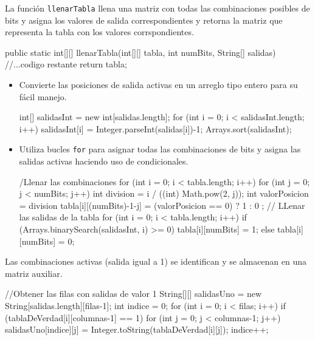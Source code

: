 La función \texttt{llenarTabla} llena una matriz con todas las combinaciones posibles de bits y asigna los valores de salida correspondientes y retorna la matriz que representa la tabla con los valores corrspondientes.
\begin{javaCode}
    public static int[][] llenarTabla(int[][] tabla, int numBits, String[] salidas) {
    //...codigo restante
    return tabla;
    }
\end{javaCode}
   \begin{itemize}
       \item[{\ieeeguilsinglright}] {\it } Convierte las posiciones de salida activas en un arreglo tipo entero para su fácil manejo.
   \begin{javaCode}
    int[] salidasInt = new int[salidas.length];
    for (int i = 0; i < salidasInt.length; i++) {
        salidasInt[i] = Integer.parseInt(salidas[i])-1;
    }
    Arrays.sort(salidasInt);
   \end{javaCode}
       
       \item[{\ieeeguilsinglright}] {\it }  Utiliza bucles \texttt{for} para asignar todas las combinaciones de bits y asigna las salidas activas haciendo uso de condicionales.
    \begin{javaCode}
    /Llenar las combinaciones
    for (int i = 0; i < tabla.length; i++) {
        for (int j = 0; j < numBits; j++) {
            int division = i / ((int) Math.pow(2, j));
            int valorPosicion = division %
            tabla[i][(numBits)-1-j] = (valorPosicion == 0)   ?   1 : 0 ;
        }
    }
    // LLenar las salidas de la tabla
    for (int i = 0; i < tabla.length; i++) {
        if (Arrays.binarySearch(salidasInt, i) >= 0) {
            tabla[i][numBits] = 1;
        } else {
            tabla[i][numBits] = 0;
        }
    }
    \end{javaCode}

   \end{itemize}


Las combinaciones activas (salida igual a 1) se identifican y se almacenan en una matriz auxiliar.
\begin{javaCode}
//Obtener las filas con salidas de valor 1
String[][] salidasUno = new String[salidas.length][filas-1];
int indice = 0;
for (int i = 0; i < filas; i++) {
    if (tablaDeVerdad[i][columnas-1] == 1) {
        for (int j = 0; j < columnas-1; j++) {
            salidasUno[indice][j] = 
            Integer.toString(tablaDeVerdad[i][j]);
        }
        indice++;
    }
}
\end{javaCode}

